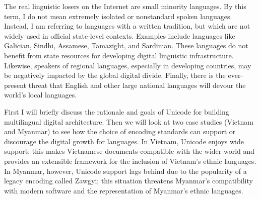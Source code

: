 The real linguistic losers on the Internet are small minority languages. By this
term, I do not mean extremely isolated or nonstandard spoken languages.
Instead, I am referring to languages with a written tradition, but which are not
widely used in official state-level contexts. Examples include languages like
Galician, Sindhi, Assamese, Tamazight, and Sardinian. These languages do not
benefit from state resources for developing digital linguistic infrastructure.
Likewise, speakers of regional languages, especially in developing countries,
may be negatively impacted by the global digital divide. Finally, there is the
ever-present threat that English and other large national languages will devour
the world's local languages. 

First I will briefly discuss the rationale and goals of Unicode for building
multilingual digital architecture. Then we will look at two case studies
(Vietnam and Myanmar) to see how the choice of encoding standards can support or
discourage the digital growth for languages. In Vietnam, Unicode enjoys wide
support; this makes Vietnamese documents compatible with the wider world and
provides an extensible framework for the inclusion of Vietnam's ethnic
languages. In Myanmar, however, Unicode support lags behind due to the
popularity of a legacy encoding called Zawgyi; this situation threatens
Myanmar's compatibility with modern software and the representation of Myanmar's
ethnic languages.
